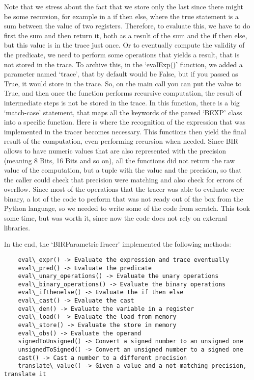 Note that we stress about the fact that we store only the last since there might
be some recursion, for example in a if then else, where the true statement is a
sum between the value of two registers. Therefore, to evaluate this, we have to do
first the sum and then return it, both as a result of the sum and the if then
else, but this value is in the trace just once. Or to eventually compute the
validity of the predicate, we need to perform some operations that yields a result,
that is not stored in the trace. To archive this, in the `evalExp()' function, we
added a parameter named `trace', that by default would be False, but if you passed
as True, it would store in the trace. So, on the main call you can put the value
to True, and then once the function performs recursive computation, the result
of intermediate steps is not be stored in the trace. In this function, there is
a big `match-case' statement, that maps all the keywords of the parsed `BEXP' class
into a specific function. Here is where the recognition of the expression that
was implemented in the tracer becomes necessary. This functions then yield the final
result of the computation, even performing recursion when needed. Since BIR allows
to have numeric values that are also represented with the precision (meaning 8
Bits, 16 Bits and so on), all the functions did not return the raw value of the computation,
but a tuple with the value and the precision, so that the caller could check that
precision were matching and also check for errors of overflow. Since most of the
operations that the tracer was able to evaluate were binary, a lot of the code to
perform that was not ready out of the box from the Python language, so we needed
to write some of the code from scratch. This took some time, but was worth it, since
now the code does not rely on external libraries.

In the end, the `BIRParametricTracer' implemented the following methods: \begin{verbatim}
    eval\_expr() -> Evaluate the expression and trace eventually
    eval\_pred() -> Evaluate the predicate
    eval\_unary_operations() -> Evaluate the unary operations 
    eval\_binary_operations() -> Evaluate the binary operations
    eval\_ifthenelse() -> Evaluate the if then else
    eval\_cast() -> Evaluate the cast
    eval\_den() -> Evaluate the variable in a register
    eval\_load() -> Evaluate the load from memory
    eval\_store() -> Evaluate the store in memory
    eval\_obs() -> Evaluate the operand
    signedToUnsigned() -> Convert a signed number to an unsigned one
    unsignedToSigned() -> Convert an unsigned number to a signed one
    cast() -> Cast a number to a different precision
    translate\_value() -> Given a value and a not-matching precision, translate it
\end{verbatim}

